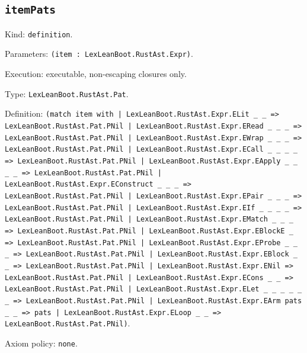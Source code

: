 \documentclass[11pt]{article}
\begin{document}
\subsection*{\texttt{itemPats}}
\noindent Kind: \texttt{definition}.\par
\noindent Parameters: \texttt{(item : LexLeanBoot.RustAst.Expr)}.\par
\noindent Execution: executable, non-escaping closures only.\par
\noindent Type: \texttt{LexLeanBoot.RustAst.Pat}.\par
\noindent Definition: \texttt{(match item with | LexLeanBoot.RustAst.Expr.ELit \_ \_ => LexLeanBoot.RustAst.Pat.PNil | LexLeanBoot.RustAst.Expr.ERead \_ \_ \_ => LexLeanBoot.RustAst.Pat.PNil | LexLeanBoot.RustAst.Expr.EWrap \_ \_ \_ => LexLeanBoot.RustAst.Pat.PNil | LexLeanBoot.RustAst.Expr.ECall \_ \_ \_ \_ => LexLeanBoot.RustAst.Pat.PNil | LexLeanBoot.RustAst.Expr.EApply \_ \_ \_ \_ => LexLeanBoot.RustAst.Pat.PNil | LexLeanBoot.RustAst.Expr.EConstruct \_ \_ \_ => LexLeanBoot.RustAst.Pat.PNil | LexLeanBoot.RustAst.Expr.EPair \_ \_ \_ => LexLeanBoot.RustAst.Pat.PNil | LexLeanBoot.RustAst.Expr.EIf \_ \_ \_ \_ => LexLeanBoot.RustAst.Pat.PNil | LexLeanBoot.RustAst.Expr.EMatch \_ \_ \_ => LexLeanBoot.RustAst.Pat.PNil | LexLeanBoot.RustAst.Expr.EBlockE \_ => LexLeanBoot.RustAst.Pat.PNil | LexLeanBoot.RustAst.Expr.EProbe \_ \_ \_ => LexLeanBoot.RustAst.Pat.PNil | LexLeanBoot.RustAst.Expr.EBlock \_ \_ => LexLeanBoot.RustAst.Pat.PNil | LexLeanBoot.RustAst.Expr.ENil => LexLeanBoot.RustAst.Pat.PNil | LexLeanBoot.RustAst.Expr.ECons \_ \_ => LexLeanBoot.RustAst.Pat.PNil | LexLeanBoot.RustAst.Expr.ELet \_ \_ \_ \_ \_ \_ => LexLeanBoot.RustAst.Pat.PNil | LexLeanBoot.RustAst.Expr.EArm pats \_ \_ => pats | LexLeanBoot.RustAst.Expr.ELoop \_ \_ => LexLeanBoot.RustAst.Pat.PNil)}.\par
\noindent Axiom policy: \texttt{none}.\par
\end{document}
